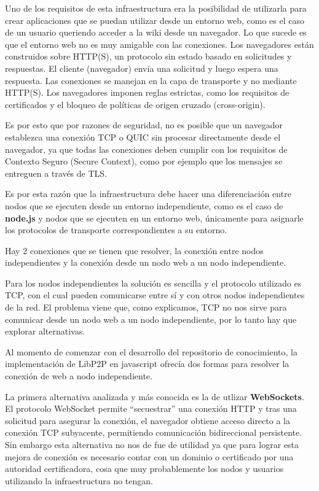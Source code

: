 Uno de los requisitos de esta infraestructura era la posibilidad de utilizarla para crear aplicaciones que se puedan utilizar desde un entorno web, como es el caso de un usuario queriendo acceder a la wiki desde un navegador. Lo que sucede es que el entorno web no es muy amigable con las conexiones. Los navegadores están construidos sobre HTTP(S), un protocolo sin estado basado en solicitudes y respuestas. El cliente (navegador) envía una solicitud y luego espera una respuesta. Las conexiones se manejan en la capa de transporte y no mediante HTTP(S). Los navegadores imponen reglas estrictas, como los requisitos de certificados y el bloqueo de políticas de origen cruzado (cross-origin).

Es por esto que por razones de seguridad, no es posible que un navegador establezca una conexión TCP o QUIC sin procesar directamente desde el navegador, ya que todas las conexiones deben cumplir con los requisitos de Contexto Seguro (Secure Context), como por ejemplo que los mensajes se entreguen a través de TLS.

Es por esta razón que la infraestructura debe hacer una diferenciación entre nodos que se ejecuten desde un entorno independiente, como es el caso de \textbf{node.js}\cite{nodejs} y nodos que se ejecuten en un entorno web, únicamente para asignarle los protocolos de transporte correspondientes a su entorno.

Hay 2 conexiones que se tienen que resolver, la conexión entre nodos independientes y la conexión desde un nodo web a un nodo independiente.

Para los nodos independientes la solución es sencilla y el protocolo utilizado es TCP, con el cual pueden comunicarse entre sí y con otros nodos independientes de la red. El problema viene que, como explicamos, TCP no nos sirve para comunicar desde un nodo web a un nodo independiente, por lo tanto hay que explorar alternativas.

Al momento de comenzar con el desarrollo del repositorio de conocimiento, la implementación de LibP2P en javascript ofrecía dos formas para resolver la conexión de web a nodo independiente.

La primera alternativa analizada y más conocida es la de utlizar \textbf{WebSockets}\cite{websocket}. El protocolo WebSocket permite “secuestrar” una conexión HTTP y tras una solicitud para asegurar la conexión, el navegador obtiene acceso directo a la conexión TCP subyacente, permitiendo comunicación bidireccional persistente. Sin embargo esta alternativa no nos de fue de utilidad ya que para lograr esta mejora de conexión es necesario contar con un dominio o certificado por una autoridad certificadora, cosa que muy probablemente los nodos y usuarios utilizando la infraestructura no tengan.

